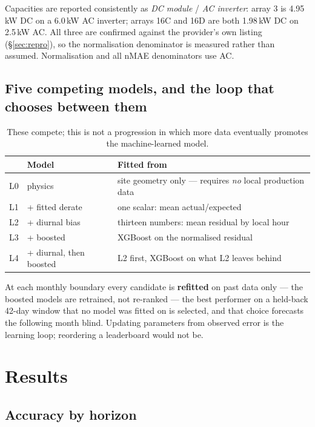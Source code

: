 \documentclass[11pt,a4paper]{article}
\newcommand{\unit}[1]{\,\textsf{\small #1}}
\begin{document}
Capacities are reported consistently as \emph{DC module} / \emph{AC inverter}:
array 3 is 4.95\unit{kW} DC on a 6.0\unit{kW} AC inverter; arrays 16C and 16D
are both 1.98\unit{kW} DC on 2.5\unit{kW} AC. All three are confirmed against
the provider's own listing (\S\ref{sec:repro}), so the normalisation denominator
is measured rather than assumed. Normalisation and all nMAE denominators
use AC.

\subsection{Five competing models, and the loop that chooses between them}

\begin{table}[H]
\centering\small
\begin{tabular}{@{}llp{8.4cm}@{}}
\toprule
& \textbf{Model} & \textbf{Fitted from} \\
\midrule
L0 & physics & site geometry only --- requires \emph{no} local production data \\
L1 & + fitted derate & one scalar: mean actual/expected \\
L2 & + diurnal bias & thirteen numbers: mean residual by local hour \\
L3 & + boosted & XGBoost on the normalised residual \\
L4 & + diurnal, then boosted & L2 first, XGBoost on what L2 leaves behind \\
\bottomrule
\end{tabular}
\caption{These compete; this is not a progression in which more data eventually
promotes the machine-learned model.}
\end{table}

At each monthly boundary every candidate is \textbf{refitted} on past data only
--- the boosted models are retrained, not re-ranked --- the best performer on a
held-back 42-day window that no model was fitted on is selected, and that choice
forecasts the following month blind. Updating parameters from observed error is
the learning loop; reordering a leaderboard would not be.

\section{Results}

\subsection{Accuracy by horizon}
\end{document}
